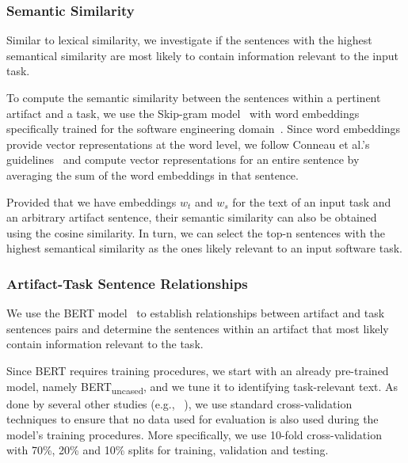 

\subsubsection{Semantic Similarity}
\label{cp5:skip-gram}



Similar to lexical similarity,  we investigate if the sentences with the highest semantical similarity are most likely to contain information relevant to the input task.


To compute the semantic similarity between the sentences within a pertinent artifact and a task,
we use the Skip-gram model~\cite{Mikolov2013} with word embeddings specifically trained for the software engineering domain~\cite{Efstathiou2018}.
Since word embeddings provide vector representations at the word level, we follow Conneau et al.'s guidelines~\cite{conneau2018} 
and compute vector representations for an entire sentence by averaging the sum of the word embeddings in that sentence.


Provided that we have embeddings $w_t$ and $w_s$ for the text 
of an input task and an arbitrary artifact sentence, 
their semantic similarity can also be obtained 
using the cosine similarity. In turn, we can select the top-n sentences
with the highest semantical similarity as the ones likely relevant to an input software task.




\subsubsection{Artifact-Task Sentence Relationships}
\label{cp5:bert}


We use the BERT model~\cite{Devlin2018Bert} to establish relationships between artifact and task sentences pairs and determine 
the sentences within an artifact that most likely contain information relevant to the task.


Since BERT requires training procedures, we start with an already pre-trained model, namely BERT\textsubscript{uncased}, and we tune it to  identifying task-relevant text.
As done by several other studies (e.g., ~\cite{Chaparro2017, fucci2019, Petrosyan2015}), we use standard cross-validation techniques to ensure  that no data used for evaluation is also used
during the model's training procedures. More specifically, we use 10-fold cross-validation with 70\%, 20\% and 10\% splits for training, validation and testing. 


